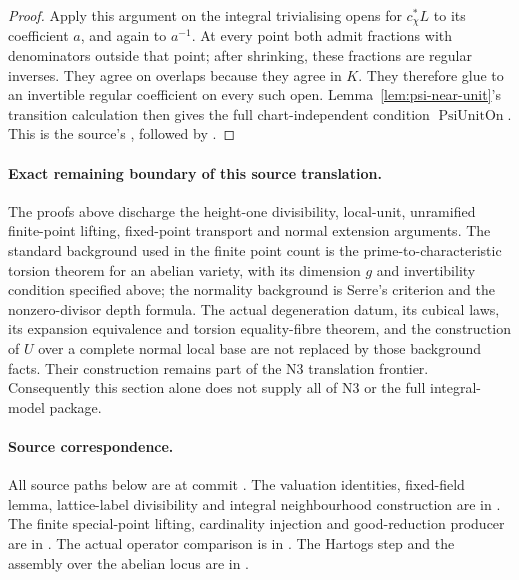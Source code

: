 \begin{proof}
Apply this argument on the integral trivialising opens for
\(c_\chi^*L\) to its coefficient \(a\), and again to \(a^{-1}\).
At every point both admit fractions with denominators outside that
point; after shrinking, these fractions are regular inverses.
They agree on overlaps because they agree in \(K\).
They therefore glue to an invertible regular coefficient on every
such open.  Lemma~\ref{lem:psi-near-unit}'s transition calculation
then gives the full chart-independent condition
\(\operatorname{PsiUnitOn}\).
This is the source's , followed by
.
\end{proof}

\paragraph{Exact remaining boundary of this source translation.}
The proofs above discharge the height-one divisibility, local-unit,
unramified finite-point lifting, fixed-point transport and normal
extension arguments.  The standard background used in the finite
point count is the prime-to-characteristic torsion theorem for an
abelian variety, with its dimension \(g\) and invertibility condition
specified above; the normality background is Serre's criterion and
the nonzero-divisor depth formula.
The actual degeneration datum, its cubical laws, its expansion
equivalence and torsion equality-fibre theorem, and the construction
of \(U\) over a complete normal local base are not replaced by those
background facts.  Their construction remains part of the N3
translation frontier.  Consequently this section alone does not
supply all of N3 or the full integral-model package.

\paragraph{Source correspondence.}
All source paths below are at commit
.
The valuation identities, fixed-field lemma, lattice-label
divisibility and integral neighbourhood construction are in
.
The finite special-point lifting, cardinality injection and
good-reduction producer are in
.
The actual operator comparison is in
.
The Hartogs step and the assembly over the abelian locus are in
.
